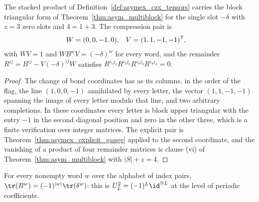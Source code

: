 \begin{theorem}
    \label{thm:asymex_czx_compression}
    \leanok
    The stacked product of Definition~\ref{def:asymex_czx_tensors} carries
    the block triangular form of Theorem~\ref{thm:asym_multiblock} for the
    single slot $-\delta$ with $z=3$ zero slots and $4=1+3$. The
    compression pair is
    \begin{align}
        W & =(0,0,-1,0),
          &
        V & =(1,1,-1,-1)^{\mathsf T},
        \notag
    \end{align}
    with $WV=1$ and $WB^wV=(-\delta)^w$ for every word, and the remainder
    $R^{ij}=B^{ij}-V(-\delta)^{ij}W$ satisfies
    $R^{i_1j_1}R^{i_2j_2}R^{i_3j_3}R^{i_4j_4}=0$.
\end{theorem}

\begin{proof}
    \leanok
    The change of bond coordinates has as its columns, in the order of the
    flag, the line $(1,0,0,-1)$ annihilated by every letter, the vector
    $(1,1,-1,-1)$ spanning the image of every letter modulo that line, and
    two arbitrary completions. In these coordinates every letter is block
    upper triangular with the entry $-1$ in the second diagonal position and
    zero in the other three, which is a finite verification over integer
    matrices. The explicit pair is
    Theorem~\ref{thm:asymex_explicit_gauge} applied to the second
    coordinate, and the vanishing of a product of four remainder matrices is
    clause (vi) of Theorem~\ref{thm:asym_multiblock} with $|S|+z=4$.
\end{proof}

\begin{theorem}
    \label{thm:asymex_czx_trace}
    \leanok
    For every nonempty word $w$ over the alphabet of index pairs,
    $\tr(B^w)=(-1)^{|w|}\tr(\delta^w)$: this is
    $U_L^2=(-1)^L\id^{\otimes L}$ at the level of periodic coefficients.
\end{theorem}


